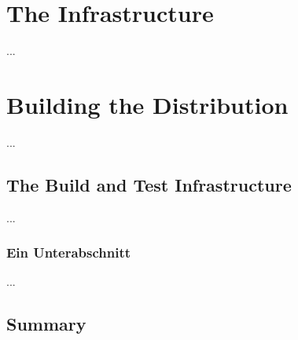 
\chapter{The  Infrastructure}
\label{cha:Infrastructure}

...



\chapter{Building the  Distribution}
\label{cha:Distribution}

...

\section{The Build and Test Infrastructure}
\label{sec:The-Build-and-Test-Infrastructure}

...

\subsection{Ein Unterabschnitt}

...

\section{Summary}

